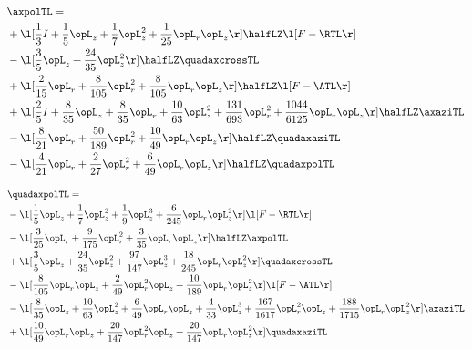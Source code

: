 \begin{alignat}{2} 
\label{eq:linaxpolTL_1} 
& \axpolTL = \\ 
& + \l[ \frac{1}{3} I + \frac{1}{5} \opL_z + \frac{1}{7} \opL_z^{2} + \frac{1}{25} \opL_r \opL_z  \r] \halfLZ \l[ F - \RTL \r] \nonumber \\ 
& - \l[ \frac{3}{5} \opL_z + \frac{24}{35} \opL_z^{2}  \r] \halfLZ \quadaxcrossTL \nonumber \\ 
& + \l[ \frac{2}{15} \opL_r + \frac{8}{105} \opL_r^{2} + \frac{8}{105} \opL_r \opL_z  \r] \halfLZ \l[ F - \ATL \r] \nonumber \\ 
& + \l[ \frac{2}{5} I + \frac{8}{35} \opL_z + \frac{8}{35} \opL_r + \frac{10}{63} \opL_z^{2} + \frac{131}{693} \opL_r^{2} + \frac{1044}{6125} \opL_r \opL_z  \r] \halfLZ \axaziTL \nonumber \\ 
& - \l[ \frac{8}{21} \opL_r + \frac{50}{189} \opL_r^{2} + \frac{10}{49} \opL_r \opL_z  \r] \halfLZ \quadaxaziTL \nonumber \\ 
& - \l[ \frac{4}{21} \opL_r + \frac{2}{27} \opL_r^{2} + \frac{6}{49} \opL_r \opL_z  \r] \halfLZ \quadaxpolTL \nonumber \\ 
\end{alignat} 


\begin{alignat}{2} 
\label{eq:quadaxpolTL_1} 
& \quadaxpolTL = \\ 
& - \l[ \frac{1}{5} \opL_z + \frac{1}{7} \opL_z^{2} + \frac{1}{9} \opL_z^{3} + \frac{6}{245} \opL_r \opL_z^{2}  \r] \l[ F - \RTL \r] \nonumber \\ 
& - \l[ \frac{3}{25} \opL_r + \frac{9}{175} \opL_r^{2} + \frac{3}{35} \opL_r \opL_z  \r] \halfLZ \axpolTL \nonumber \\ 
& + \l[ \frac{3}{5} \opL_z + \frac{24}{35} \opL_z^{2} + \frac{97}{147} \opL_z^{3} + \frac{18}{245} \opL_r \opL_z^{2}  \r] \quadaxcrossTL \nonumber \\ 
& - \l[ \frac{8}{105} \opL_r \opL_z + \frac{2}{49} \opL_r^{2} \opL_z + \frac{10}{189} \opL_r \opL_z^{2}  \r] \l[ F - \ATL \r] \nonumber \\ 
& - \l[ \frac{8}{35} \opL_z + \frac{10}{63} \opL_z^{2} + \frac{6}{49} \opL_r \opL_z + \frac{4}{33} \opL_z^{3} + \frac{167}{1617} \opL_r^{2} \opL_z + \frac{188}{1715} \opL_r \opL_z^{2}  \r] \axaziTL \nonumber \\ 
& + \l[ \frac{10}{49} \opL_r \opL_z + \frac{20}{147} \opL_r^{2} \opL_z + \frac{20}{147} \opL_r \opL_z^{2}  \r] \quadaxaziTL \nonumber \\ 
\end{alignat} 


